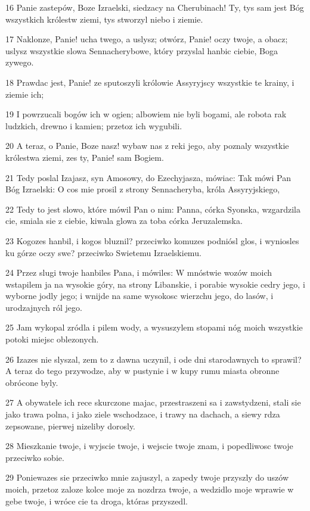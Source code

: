 \par 16 Panie zastepów, Boze Izraelski, siedzacy na Cherubinach! Ty, tys sam jest Bóg wszystkich królestw ziemi, tys stworzyl niebo i ziemie.
\par 17 Naklonze, Panie! ucha twego, a uslysz; otwórz, Panie! oczy twoje, a obacz; uslysz wszystkie slowa Sennacherybowe, który przyslal hanbic ciebie, Boga zywego.
\par 18 Prawdac jest, Panie! ze sputoszyli królowie Assyryjscy wszystkie te krainy, i ziemie ich;
\par 19 I powrzucali bogów ich w ogien; albowiem nie byli bogami, ale robota rak ludzkich, drewno i kamien; przetoz ich wygubili.
\par 20 A teraz, o Panie, Boze nasz! wybaw nas z reki jego, aby poznaly wszystkie królestwa ziemi, zes ty, Panie! sam Bogiem.
\par 21 Tedy poslal Izajasz, syn Amosowy, do Ezechyjasza, mówiac: Tak mówi Pan Bóg Izraelski: O cos mie prosil z strony Sennacheryba, króla Assyryjskiego,
\par 22 Tedy to jest slowo, które mówil Pan o nim: Panna, córka Syonska, wzgardzila cie, smiala sie z ciebie, kiwala glowa za toba córka Jeruzalemska.
\par 23 Kogozes hanbil, i kogos bluznil? przeciwko komuzes podniósl glos, i wyniosles ku górze oczy swe? przeciwko Swietemu Izraelskiemu.
\par 24 Przez slugi twoje hanbiles Pana, i mówiles: W mnóstwie wozów moich wstapilem ja na wysokie góry, na strony Libanskie, i porabie wysokie cedry jego, i wyborne jodly jego; i wnijde na same wysokosc wierzchu jego, do lasów, i urodzajnych ról jego.
\par 25 Jam wykopal zródla i pilem wody, a wysuszylem stopami nóg moich wszystkie potoki miejsc oblezonych.
\par 26 Izazes nie slyszal, zem to z dawna uczynil, i ode dni starodawnych to sprawil? A teraz do tego przywodze, aby w pustynie i w kupy rumu miasta obronne obrócone byly.
\par 27 A obywatele ich rece skurczone majac, przestraszeni sa i zawstydzeni, stali sie jako trawa polna, i jako ziele wschodzace, i trawy na dachach, a siewy rdza zepsowane, pierwej nizeliby dorosly.
\par 28 Mieszkanie twoje, i wyjscie twoje, i wejscie twoje znam, i popedliwosc twoje przeciwko sobie.
\par 29 Poniewazes sie przeciwko mnie zajuszyl, a zapedy twoje przyszly do uszów moich, przetoz zaloze kolce moje za nozdrza twoje, a wedzidlo moje wprawie w gebe twoje, i wróce cie ta droga, któras przyszedl.
